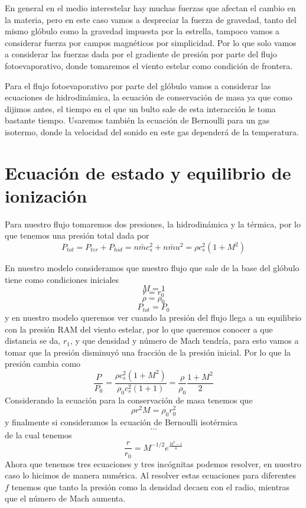 \documentclass{book}
\begin{document}
En general en el medio interestelar hay muchas fuerzas que afectan el cambio en la materia, pero en este caso vamos a despreciar la fuerza de gravedad, tanto del mismo glóbulo como la gravedad impuesta por la estrella, tampoco vamos a considerar fuerza por campos magnéticos por simplicidad. Por lo que solo vamos a considerar las fuerzas dada por el gradiente de presión por parte del flujo fotoevaporativo, donde tomaremos el viento estelar como condición de frontera.

Para el flujo fotoevaporativo por parte del glóbulo vamos a considerar las ecuaciones de hidrodinámica, la ecuación de conservación de masa ya que como dijimos antes, el tiempo en el que un bulto sale de esta interacción le toma bastante tiempo. Usaremos también la ecuación de Bernoulli para un gas isotermo, donde la velocidad del sonido en este gas dependerá de la temperatura.


\section{Ecuación de estado y equilibrio de ionización}

Para nuestro flujo tomaremos dos presiones, la hidrodinámica y la térmica, por lo que tenemos una presión total dada por
\[P_{tot}=P_{ter}+P_{hid}=n\bar{m}c_s^2+n\bar{m}u^2=\rho c_s^2(1+M^2)\]

En nuestro modelo consideramos que nuestro flujo que sale de la base del glóbulo tiene como condiciones iniciales
\[M=1\]
\[r=r_0\]
\[\rho=\rho_0\]
\[P_{tot}=P_0\]
y en nuestro modelo queremos ver cuando la presión del flujo llega a un equilibrio con la presión RAM del viento estelar, por lo que queremos conocer a que distancia se da, $r_1$, y que densidad y número de Mach tendría, para esto vamos a tomar que la presión disminuyó una fracción de la presión inicial. Por lo que la presión cambia como 
\[\frac{P}{P_0}=\frac{\rho c_s^2(1+M^2)}{\rho_0 c_s^2(1+1)}=\frac{\rho}{\rho_0}\frac{1+M^2}{2}\]
Considerando la ecuación para la conservación de masa tenemos que
\[\rho r^2M	=\rho_0 r_0^2\]
y finalmente si consideramos la ecuación de Bernoulli isotérmica 
\[\dots\]
de la cual tenemos 
\[\frac{r}{r_0}=M^{-1/2}e^{\frac{M^2-1}{4}}\]
Ahora que tenemos tres ecuaciones y tres incógnitas podemos resolver, en nuestro caso lo hicimos de manera numérica. Al resolver estas ecuaciones para diferentes $f$ tenemos que tanto la presión como la densidad decaen con el radio, mientras que el número de Mach aumenta.
\end{document}
